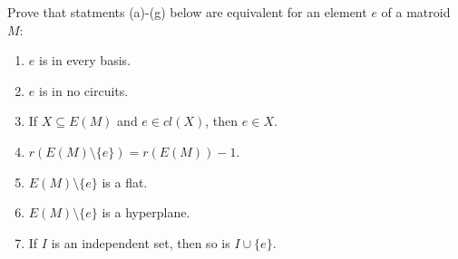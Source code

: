 \prob
{
    Prove that statments (a)-(g) below are equivalent for an element $e$ of a matroid $M$:
    \begin{enumerate}[label=(\alph*)]
        \item $e$ is in every basis.
        \item $e$ is in no circuits.
        \item If $X \subseteq E(M)$ and $e \in cl(X)$, then $e \in X$.
        \item $r(E(M) \setminus \{e\}) = r(E(M)) - 1$.
        \item $E(M) \setminus \{e\}$ is a flat.
        \item $E(M) \setminus \{e\}$ is a hyperplane.
        \item If $I$ is an independent set, then so is $I \cup \{ e \}$.
    \end{enumerate}
}
